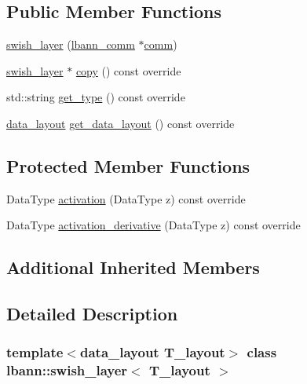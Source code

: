 \subsection*{Public Member Functions}
\begin{DoxyCompactItemize}
\item 
\hyperlink{classlbann_1_1swish__layer_a63d8d4087762ff49954270fde6b03707}{swish\+\_\+layer} (\hyperlink{classlbann_1_1lbann__comm}{lbann\+\_\+comm} $\ast$\hyperlink{file__io_8cpp_ab048c6f9fcbcfaa57ce68b00263dbebe}{comm})
\item 
\hyperlink{classlbann_1_1swish__layer}{swish\+\_\+layer} $\ast$ \hyperlink{classlbann_1_1swish__layer_ad88f1660edf910883ab89ef66e4cf14d}{copy} () const override
\item 
std\+::string \hyperlink{classlbann_1_1swish__layer_a136f8194f91a1148ab31bce29c08e3c8}{get\+\_\+type} () const override
\item 
\hyperlink{base_8hpp_a786677cbfb3f5677b4d84f3056eb08db}{data\+\_\+layout} \hyperlink{classlbann_1_1swish__layer_ac7d29fc0d26bdb58df88e43635141275}{get\+\_\+data\+\_\+layout} () const override
\end{DoxyCompactItemize}
\subsection*{Protected Member Functions}
\begin{DoxyCompactItemize}
\item 
Data\+Type \hyperlink{classlbann_1_1swish__layer_aeab50ff2ad06d89a54953efdf7c09ed4}{activation} (Data\+Type z) const override
\item 
Data\+Type \hyperlink{classlbann_1_1swish__layer_a42d0ffb540fe1c12fbb571abf7048c2a}{activation\+\_\+derivative} (Data\+Type z) const override
\end{DoxyCompactItemize}
\subsection*{Additional Inherited Members}


\subsection{Detailed Description}
\subsubsection*{template$<$data\+\_\+layout T\+\_\+layout$>$\newline
class lbann\+::swish\+\_\+layer$<$ T\+\_\+layout $>$}

